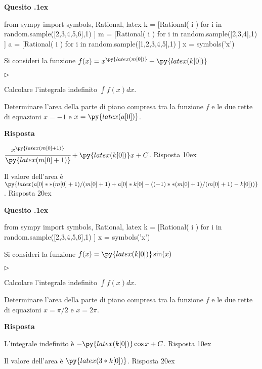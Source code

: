 \documentclass[11pt,twoside,a4paper]{article}
\newcommand{\mylabel}[1]{#1\hfill}
\renewenvironment{itemize}
  {\begin{list}{$\triangleright$}{%
   \setlength{\parskip}{0mm}
   \setlength{\topsep}{.4\baselineskip}
   \setlength{\rightmargin}{0mm}
   \setlength{\listparindent}{0mm}
   \setlength{\itemindent}{0mm}
   \setlength{\labelwidth}{2ex}
   \setlength{\itemsep}{.4\baselineskip}
   \setlength{\parsep}{0mm}
   \setlength{\partopsep}{0mm}
   \setlength{\labelsep}{1ex}
   \setlength{\leftmargin}{\labelwidth+\labelsep}
   \let\makelabel\mylabel}}{%
   \end{list}\vspace*{-1.3mm}}
\newcounter{quesito}
\newenvironment{question}{\bigskip\addtocounter{quesito}{1}\bigskip\bigskip\par\textbf{Quesito \thequesito.\kern1ex}}{\vspace{\parskip}}
\newenvironment{answer}{\par\textbf{Risposta\quad}}{\vspace{\parskip}}
\begin{document}
\begin{question}
\begin{pycode}
from sympy import symbols, Rational, latex
k = [Rational( i ) for i in random.sample([2,3,4,5,6],1) ]
m = [Rational( i ) for i in random.sample([2,3,4],1) ]
a = [Rational( i ) for i in random.sample([1,2,3,4,5],1) ]
x = symbols('x')
\end{pycode}
Si consideri la funzione $f(x) = x^{\py{latex(m[0])}} + \py{latex(k[0])}$
\begin{itemize}
\item[1.] Calcolare l'integrale indefinito $\displaystyle \int f(x) dx$.
\item[2.] Determinare l'area della parte di piano compresa tra la funzione $f$ e le due rette di equazioni $x = -1$ e $x = \py{latex(a[0])}$.
\end{itemize}
\begin{answer}

{\color{blue} $\cfrac{x^{\py{latex(m[0]+1)}}}{\py{latex(m[0]+1)}} + \py{latex(k[0])}x + C$. 
\hfill Risposta 1\kern0ex}


\medskip
{\color{blue} Il valore dell'area è $\py{latex(a[0]**(m[0]+1)/(m[0]+1)+a[0]*k[0] - ((-1)**(m[0]+1)/(m[0]+1)-k[0]))}$.
\hfill Risposta 2\kern0ex}

\end{answer}
\end{question}
\begin{question}
\begin{pycode}
from sympy import symbols, Rational, latex
k = [Rational( i ) for i in random.sample([2,3,4,5,6],1) ]
x = symbols('x')
\end{pycode}
Si consideri la funzione $f(x) = \py{latex(k[0])}\sin(x)$
\begin{itemize}
\item[1.] Calcolare l'integrale indefinito $\displaystyle \int f(x) dx$.
\item[2.] Determinare l'area della parte di piano compresa tra la funzione $f$ e le due rette di equazioni $x = \pi/2$ e $x = 2 \pi$.
\end{itemize}
\begin{answer}

{\color{blue} L'integrale indefinito è $-\py{latex(k[0])} \cos x + C$. 
\hfill Risposta 1\kern0ex}


\medskip
{\color{blue} Il valore dell'area è $\py{latex(3*k[0])}$.
\hfill Risposta 2\kern0ex}

\end{answer}
\end{question}
\end{document}

